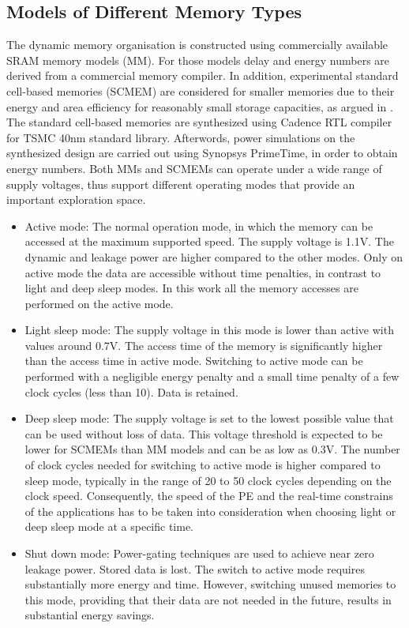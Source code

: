 \documentclass[smallcondensed]{svjour3}
\begin{document}
\subsection{Models of Different Memory Types}
The dynamic memory organisation is constructed using commercially available SRAM memory models (MM).
For those models delay and energy numbers are derived from a commercial memory compiler.
In addition, experimental standard cell-based memories (SCMEM) \cite{Mei11}  are  considered for smaller memories due to their energy and area efficiency for reasonably small storage capacities, as argued in \cite{Mei10}. 
The standard cell-based memories are synthesized using Cadence RTL compiler for TSMC 40nm standard library. 
Afterwords, power simulations on the synthesized design are carried out using Synopsys PrimeTime, in order to obtain energy numbers.
Both MMs and SCMEMs can operate under a wide range of supply voltages, thus support different operating modes that provide an important exploration space.
\begin{itemize}
\item Active mode: The normal operation mode, in which the memory can be accessed at the maximum supported speed. The supply voltage is 1.1V. 
The dynamic and leakage power are higher compared to the other modes.
Only on active mode the data are accessible without time penalties, in contrast to light and deep sleep modes.
In this work all the memory accesses are performed on the active mode. 
\item Light sleep mode: The supply voltage in this mode is lower than active with values around 0.7V. 
The access time of the memory is significantly higher than the access time in active mode. 
Switching to active mode can be performed with a negligible energy penalty and a small time penalty of a few clock cycles (less than 10). 
Data is retained.  
\item Deep sleep mode: The supply voltage is set to the lowest possible value that can be used without loss of data. 
This voltage threshold is expected to be lower for SCMEMs than MM models and can be as low as 0.3V. 
The number of clock cycles needed for switching to active mode is higher compared to sleep mode, typically in the range of 20 to 50 clock cycles depending on the clock speed. 
Consequently, the speed of the PE and the real-time constrains of the applications has to be taken into consideration when choosing light or deep sleep mode at a specific time.  
\item Shut down mode: Power-gating techniques are used to achieve near zero leakage power. 
Stored data is lost. 
The switch to active mode requires substantially more energy and time. 
However, switching unused memories to this mode, providing that their data are not needed in the future, results in substantial energy savings.
\end{itemize}  
\end{document}
